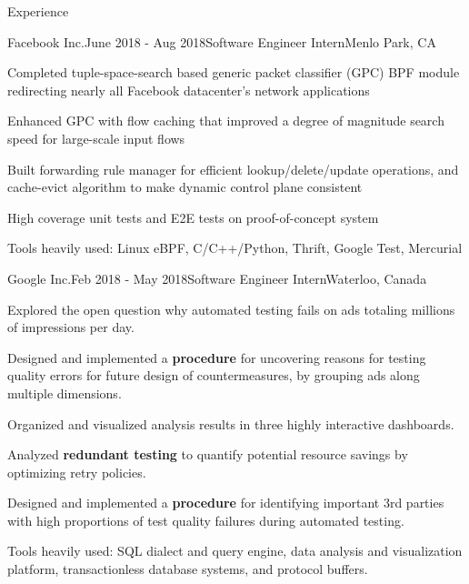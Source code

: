 \documentclass{resume} %
\begin{document}
\begin{rSection}{Experience}
\begin{rSubsection}{Facebook Inc.}{June 2018 - Aug 2018}{Software Engineer Intern}{Menlo Park, CA}
\item Completed tuple-space-search based generic packet classifier (GPC) BPF module redirecting nearly all Facebook datacenter’s network applications
\item Enhanced GPC with flow caching that improved a degree of magnitude search speed for large-scale input flows
\item Built forwarding rule manager for efficient lookup/delete/update operations, and cache-evict algorithm to make dynamic control plane consistent
\item High coverage unit tests and E2E tests on proof-of-concept system
\item Tools heavily used: Linux eBPF, C/C++/Python, Thrift, Google Test, Mercurial
\end{rSubsection}

\begin{rSubsection}{Google Inc.}{Feb 2018 - May 2018}{Software Engineer Intern}{Waterloo, Canada}
\item Explored the open question why automated testing fails on ads totaling millions of impressions per day.
\item Designed and implemented a \textbf{procedure} for uncovering reasons for testing quality errors for future design of countermeasures, by grouping ads along multiple dimensions.
\item Organized and visualized analysis results in three highly interactive dashboards.
\item Analyzed \textbf{redundant testing} to quantify potential resource savings by optimizing retry policies.
\item Designed and implemented a \textbf{procedure} for identifying important 3rd parties with high proportions of test quality failures during automated testing.
\item Tools heavily used: SQL dialect and query engine, data analysis and visualization platform, transactionless database systems, and protocol buffers.
\end{rSubsection}


\end{rSection}
\end{document}

